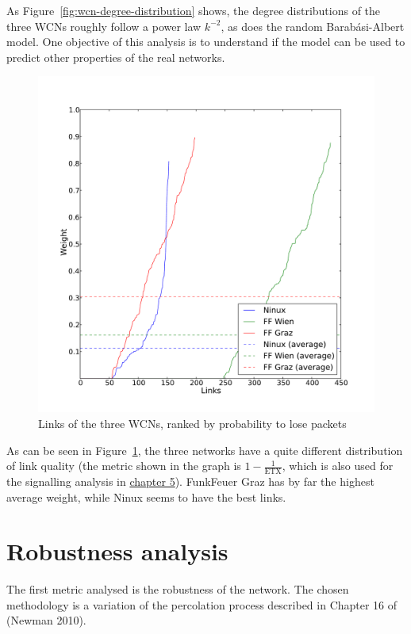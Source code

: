 \documentclass[a4paper,11pt,twoside,openleft]{memoir}
\newcommand{\figref}[1] {Figure~\ref{#1}}
\newcommand{\etx}{\mathrm{ETX}}
\begin{document}
As \figref{fig:wcn-degree-distribution}
shows, the degree distributions of the three WCNs
roughly follow a power law $k^{-2}$, as does the random Barabási-Albert
model. One objective of this analysis is to understand if the model can
be used to predict other properties of the real networks.

\begin{figure}[htb]
\centering
\includegraphics{graphs/weight_rank.pdf}
\caption{Links of the three WCNs, ranked by probability to lose packets}
\label{fig:wcn-link-ranking}
\end{figure}

As can be seen in \figref{fig:wcn-link-ranking}, the three networks have a quite
different distribution of link quality (the metric shown in the graph is
$1 - \frac{1}{\etx}$, which is also used for the signalling analysis in
\hyperref[message-propagation-analysis]{chapter 5}). FunkFeuer Graz has by far the highest average
weight, while Ninux seems to have the best links.

\chapter{Robustness analysis}\label{robustness-analysis}

The first metric analysed is the robustness of the network. The chosen
methodology is a variation of the percolation process described in
Chapter 16 of (Newman 2010).
\end{document}
